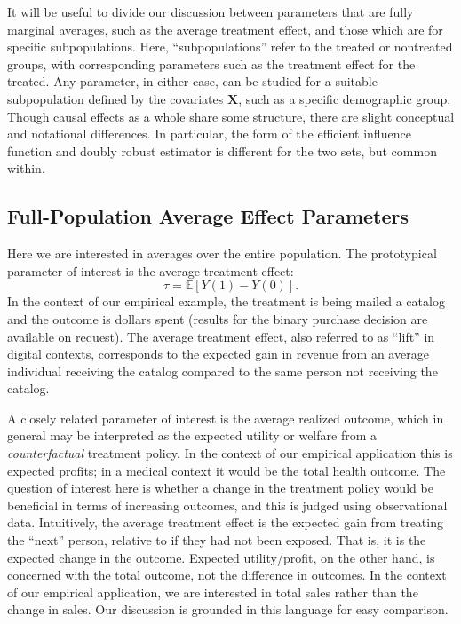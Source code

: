 \documentclass[11pt]{article}
\numberwithin{equation}{section}
\theoremstyle{definition}
\newcommand{\E}{\mathbb{E}}
\newcommand{\bX}{\bm{X}}
\begin{document}
It will be useful to divide our discussion between parameters that are fully marginal averages, such as the average treatment effect, and those which are for specific subpopulations. Here, ``subpopulations'' refer to the treated or nontreated groups, with corresponding parameters such as the treatment effect for the treated. Any parameter, in either case, can be studied for a suitable subpopulation defined by the covariates $\bX$, such as a specific demographic group. Though causal effects as a whole share some structure, there are slight conceptual and notational differences. In particular, the form of the efficient influence function and doubly robust estimator is different for the two sets, but common within.






	
	

\subsection{Full-Population Average Effect Parameters}
	\label{sec:ate}


Here we are interested in averages over the entire population. The prototypical parameter of interest is the average treatment effect:
\begin{equation}
	\label{eqn:ate}
	\tau = \E[Y(1) - Y(0)].
\end{equation}
In the context of our empirical example, the treatment is being mailed a catalog and the outcome is dollars spent (results for the binary purchase decision are available on request).  The average treatment effect, also referred to as ``lift'' in digital contexts, corresponds to the expected gain in revenue from an average individual receiving the catalog compared to the same person not receiving the catalog. 


A closely related parameter of interest is the average realized outcome, which in general may be interpreted as the expected utility or welfare from a \emph{counterfactual} treatment policy. In the context of our empirical application this is expected profits; in a medical context it would be the total health outcome. The question of interest here is whether a change in the treatment policy would be beneficial in terms of increasing outcomes, and this is judged using observational data. Intuitively, the average treatment effect is the expected gain from treating the ``next'' person, relative to if they had not been exposed. That is, it is the expected change in the outcome. Expected utility/profit, on the other hand, is concerned with the total outcome, not the difference in outcomes. In the context of our empirical application, we are interested in total sales rather than the change in sales. Our discussion is grounded in this language for easy comparison.
\end{document}
